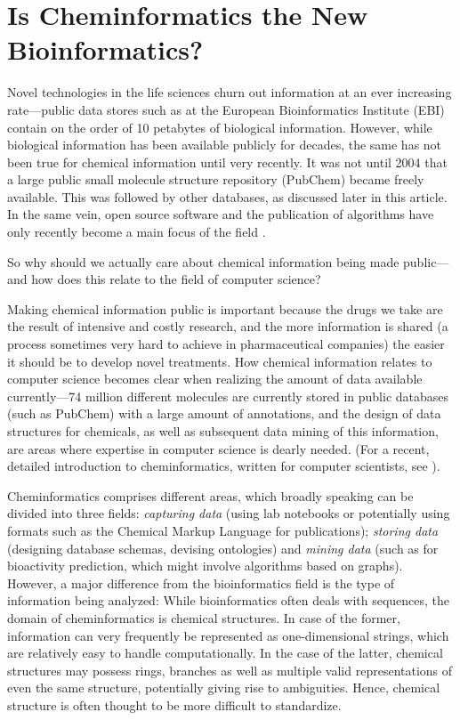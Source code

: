 \documentclass{sig-alternate}
\begin{document}
\section{Is Cheminformatics the New Bioinformatics?}

Novel technologies in the life sciences churn out information at an ever
increasing rate---public data stores such as at the European Bioinformatics
Institute (EBI) contain on the order of 10 petabytes of biological information.
However, while biological information has been available publicly for decades,
the same has not been true for chemical information until very recently. It was
not until 2004 that a large public small molecule structure repository (PubChem)
became freely available. This was followed by other databases, as discussed later
in this article. In the same vein, open source software and the publication of
algorithms have only recently become a main focus of the field
\cite{faulon2010}.

So why should we actually care about chemical information being made
public---and how does this relate to the field of computer science?

Making chemical information public is important because the
drugs we take are the result of intensive and costly research, and the
more information is shared (a process sometimes very hard to achieve
in pharmaceutical companies) the easier it should be to develop
novel treatments. How chemical information relates to computer
science becomes clear when realizing the amount of data available
currently---74 million different molecules are currently stored in
public databases (such as PubChem) with a large amount of annotations,
and the design of data structures for chemicals, as well as subsequent
data mining of this information, are areas where expertise in computer
science is dearly needed. (For a recent, detailed introduction to
cheminformatics, written for computer scientists, see
\cite{brown2009}).

Cheminformatics comprises different areas, which broadly speaking can be divided
into three fields: \emph{capturing data} (using lab notebooks or potentially using
formats such as the Chemical Markup Language for publications); \emph{storing data}
(designing database schemas, devising ontologies) and \emph{mining data} (such as for
bioactivity prediction, which might involve algorithms based on graphs).
However, a major difference from the bioinformatics field is the type of
information being analyzed: While bioinformatics often deals with sequences, the
domain of cheminformatics is chemical structures. In case of the former,
information can very frequently be represented as one-dimensional strings, which
are relatively easy to handle computationally. In the case of the latter, chemical
structures may possess rings, branches as well as multiple valid representations
of even the same structure, potentially giving rise to ambiguities. Hence,
chemical structure is often thought to be more difficult to standardize. 
\end{document}
